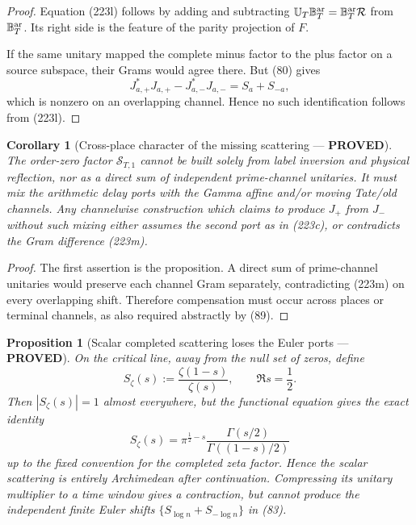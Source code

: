\documentclass[11pt]{article}
\newtheorem{proposition}[theorem]{Proposition}
\newtheorem{corollary}[theorem]{Corollary}
\newcommand{\PROVED}{\textcolor{green!45!black}{\textbf{PROVED}}}
\begin{document}
\begin{proof}
Equation (223l) follows by adding and subtracting
$\mathbb U_T\mathbb B_T^{\rm ar}=\mathbb B_T^{\rm ar}\mathcal R$ from
$\mathbb B_T^{\rm ar}$.  Its right side is the feature of the parity
projection of $F$.

If the same unitary mapped the complete minus factor to the plus factor on a
source subspace, their Grams would agree there.  But (80) gives
\begin{equation}
 J_{a,+}^*J_{a,+}-J_{a,-}^*J_{a,-}=S_a+S_{-a},       \tag{223m}
\end{equation}
which is nonzero on an overlapping channel.  Hence no such identification
follows from (223l).
\end{proof}

\begin{corollary}[Cross-place character of the missing scattering ---
\PROVED]
The order-zero factor $\mathscr S_{T,1}$ cannot be built solely from label
inversion and physical reflection, nor as a direct sum of independent
prime-channel unitaries.  It must mix the arithmetic delay ports with the
Gamma affine and/or moving Tate/old channels.  Any channelwise construction
which claims to produce $J_+$ from $J_-$ without such mixing either assumes
the second port as in (223c), or contradicts the Gram difference (223m).
\end{corollary}

\begin{proof}
The first assertion is the proposition.  A direct sum of prime-channel
unitaries would preserve each channel Gram separately, contradicting (223m)
on every overlapping shift.  Therefore compensation must occur across
places or terminal channels, as also required abstractly by (89).
\end{proof}

\begin{proposition}[Scalar completed scattering loses the Euler ports ---
\PROVED]
On the critical line, away from the null set of zeros, define
\begin{equation}
 S_\zeta(s):=\frac{\zeta(1-s)}{\zeta(s)},
 \qquad \Re s=\frac12.                               \tag{223n}
\end{equation}
Then $|S_\zeta(s)|=1$ almost everywhere, but the functional equation gives
the exact identity
\begin{equation}
 S_\zeta(s)
 =\pi^{\frac12-s}
   \frac{\Gamma(s/2)}{\Gamma((1-s)/2)}               \tag{223o}
\end{equation}
up to the fixed convention for the completed zeta factor.  Hence the scalar
scattering is entirely Archimedean after continuation.  Compressing its
unitary multiplier to a time window gives a contraction, but cannot produce
the independent finite Euler shifts
$\{S_{\log n}+S_{-\log n}\}$ in (83).
\end{proposition}
\end{document}
